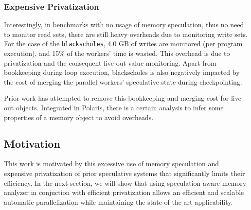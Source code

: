 \subsubsection{Expensive Privatization}

Interestingly, in benchmarks with no usage of memory speculation, thus no
need to monitor read sets, there are still heavy overheads due to
monitoring write sets. For the case of the \texttt{blackscholes}, 4.0 GB of
writes are monitored (per program execution), and 15\% of the workers' time
is wasted. This overhead is due to privatization and the consequent live-out value monitoring.
%
Apart from bookkeeping during loop execution, blackscholes is also
negatively impacted by the cost of merging the parallel workers'
speculative state during checkpointing.

Prior work has attempted to remove this bookkeeping and merging cost for
live-out objects. Integrated in Polaris, there is a certain analysis
\cite{tu:94:lcpc} to infer some properties of a memory object to avoid
overheads.


\subsection{Motivation}
This work is motivated by this excessive use of memory speculation and
expensive privatization of prior speculative systems that significantly
limits their efficiency.
%
In the next section, we will show that using speculation-aware memory
analyzer in conjuction with efficient privatization allows an efficient and
scalable automatic parallelization while maintaining the state-of-the-art
applicability.





